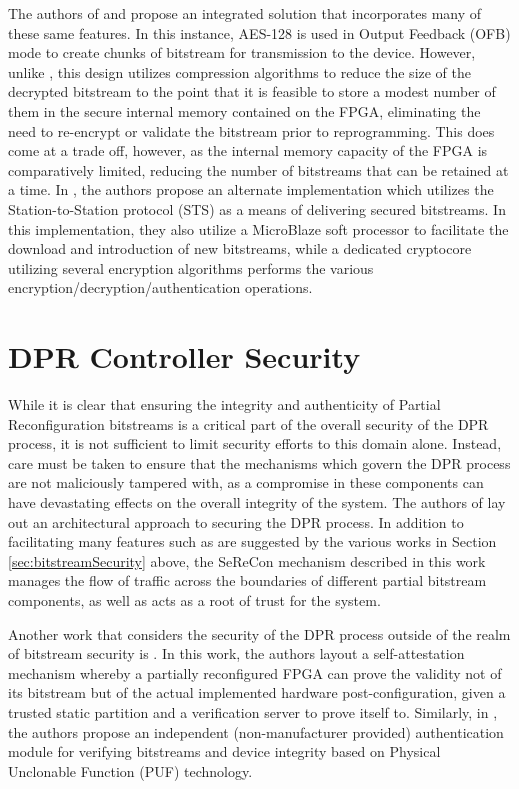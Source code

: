 The authors of \cite{vliegen_single-chip_2013} and \cite{vliegen_partial_2014} propose an integrated solution that incorporates many of these same features. In this instance, AES-128 is used in Output Feedback (OFB) mode to create chunks of bitstream for transmission to the device. However, unlike \cite{hori_bitstream_2013}, this design utilizes compression algorithms to reduce the size of the decrypted bitstream to the point that it is feasible to store a modest number of them in the secure internal memory contained on the FPGA, eliminating the need to re-encrypt or validate the bitstream prior to reprogramming. This does come at a trade off, however, as the internal memory capacity of the FPGA is comparatively limited, reducing the number of bitstreams that can be retained at a time. In \cite{vliegen_secure_2014}, the authors propose an alternate implementation which utilizes the Station-to-Station protocol (STS) as a means of delivering secured bitstreams. In this implementation, they also utilize a MicroBlaze soft processor to facilitate the download and introduction of new bitstreams, while a dedicated cryptocore utilizing several encryption algorithms performs the various 
encryption/decryption/authentication operations.

\section{DPR Controller Security} \label{sec:DPRControllerSecurity} While it is clear that ensuring the integrity and authenticity of Partial Reconfiguration bitstreams is a critical part of the overall security of the DPR process, it is not sufficient to limit security efforts to this domain alone. Instead, care must be taken to ensure that the mechanisms which govern the DPR process are not maliciously tampered with, as a compromise in these components can have devastating effects on the overall integrity of the system. The authors of \cite{kepa_serecon_2010} lay out an architectural approach to securing the DPR process. In addition to facilitating many features such as are suggested by the various works in Section \ref{sec:bitstreamSecurity} above, the SeReCon mechanism described in this work manages the flow of traffic across the boundaries of different partial bitstream components, as well as acts as a root of trust for the system.

Another work that considers the security of the DPR process outside of the realm of bitstream security is \cite{vliegen_sacha_2019}. In this work, the authors layout a self-attestation mechanism whereby a partially reconfigured FPGA can prove the validity not of its bitstream but of the actual implemented hardware post-configuration, given a trusted static partition and a verification server to prove itself to. Similarly, in \cite{jacob_securing_2017}, the authors propose an independent (non-manufacturer provided) authentication module for verifying bitstreams and device integrity based on Physical Unclonable Function (PUF) technology.

